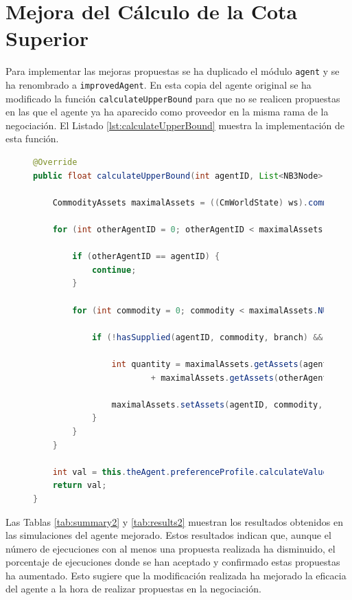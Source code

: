 \documentclass[12pt]{article}
\begin{document}
\newpage

\section{Mejora del Cálculo de la Cota Superior}\label{sec:ej2}

Para implementar las mejoras propuestas se ha duplicado el módulo \texttt{agent} y se ha renombrado a \texttt{improvedAgent}. En esta copia del agente original se ha modificado la función \texttt{calculateUpperBound} para que no se realicen propuestas en las que el agente ya ha aparecido como proveedor en la misma rama de la negociación. El Listado \ref{lst:calculateUpperBound} muestra la implementación de esta función.

\begin{figure}[h]
    \centering
    \begin{lstlisting}[language=Java, caption={Método para calcular la cota superior}, label={lst:calculateUpperBound}]
@Override
public float calculateUpperBound(int agentID, List<NB3Node> branch, NB3WorldState ws) {

    CommodityAssets maximalAssets = ((CmWorldState) ws).commodityAssets.copy();

    for (int otherAgentID = 0; otherAgentID < maximalAssets.NUM_AGENTS; otherAgentID++) {

        if (otherAgentID == agentID) {
            continue;
        }

        for (int commodity = 0; commodity < maximalAssets.NUM_COMMODITIES; commodity++) {

            if (!hasSupplied(agentID, commodity, branch) && !hasConsumed(otherAgentID, commodity, branch)) { // CHANGED

                int quantity = maximalAssets.getAssets(agentID, commodity)
                        + maximalAssets.getAssets(otherAgentID, commodity);

                maximalAssets.setAssets(agentID, commodity, quantity);
            }
        }
    }

    int val = this.theAgent.preferenceProfile.calculateValue(agentID, maximalAssets);
    return val;
}
    \end{lstlisting}
\end{figure}

Las Tablas \ref{tab:summary2} y \ref{tab:results2} muestran los resultados obtenidos en las simulaciones del agente mejorado. Estos resultados indican que, aunque el número de ejecuciones con al menos una propuesta realizada ha disminuido, el porcentaje de ejecuciones donde se han aceptado y confirmado estas propuestas ha aumentado. Esto sugiere que la modificación realizada ha mejorado la eficacia del agente a la hora de realizar propuestas en la negociación.
\end{document}

